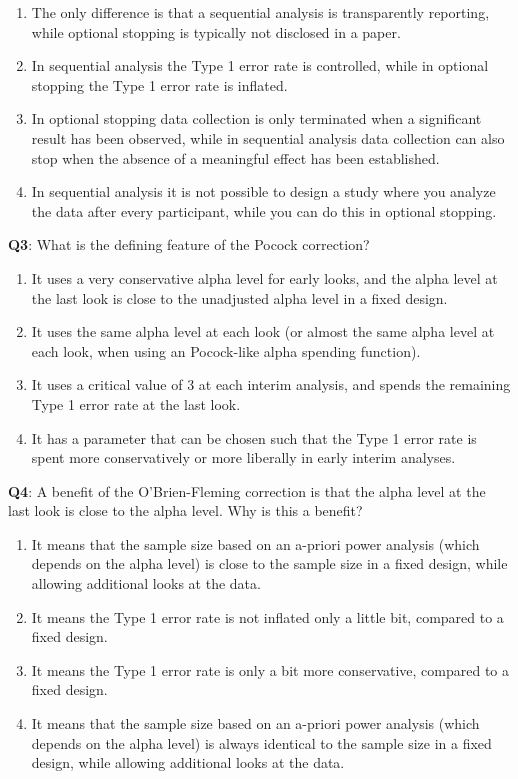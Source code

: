 \documentclass[
  oneside]{krantz}
\providecommand{\tightlist}{%
  \setlength{\itemsep}{0pt}\setlength{\parskip}{0pt}}
\begin{document}
\begin{enumerate}
\def\labelenumi{\Alph{enumi})}
\tightlist
\item
  The only difference is that a sequential analysis is transparently reporting, while optional stopping is typically not disclosed in a paper.
\item
  In sequential analysis the Type 1 error rate is controlled, while in optional stopping the Type 1 error rate is inflated.
\item
  In optional stopping data collection is only terminated when a significant result has been observed, while in sequential analysis data collection can also stop when the absence of a meaningful effect has been established.
\item
  In sequential analysis it is not possible to design a study where you analyze the data after every participant, while you can do this in optional stopping.
\end{enumerate}

\textbf{Q3}: What is the defining feature of the Pocock correction?

\begin{enumerate}
\def\labelenumi{\Alph{enumi})}
\tightlist
\item
  It uses a very conservative alpha level for early looks, and the alpha level at the last look is close to the unadjusted alpha level in a fixed design.
\item
  It uses the same alpha level at each look (or almost the same alpha level at each look, when using an Pocock-like alpha spending function).
\item
  It uses a critical value of 3 at each interim analysis, and spends the remaining Type 1 error rate at the last look.
\item
  It has a parameter that can be chosen such that the Type 1 error rate is spent more conservatively or more liberally in early interim analyses.
\end{enumerate}

\textbf{Q4}: A benefit of the O'Brien-Fleming correction is that the alpha level at the last look is close to the alpha level. Why is this a benefit?

\begin{enumerate}
\def\labelenumi{\Alph{enumi})}
\tightlist
\item
  It means that the sample size based on an a-priori power analysis (which depends on the alpha level) is close to the sample size in a fixed design, while allowing additional looks at the data.
\item
  It means the Type 1 error rate is not inflated only a little bit, compared to a fixed design.
\item
  It means the Type 1 error rate is only a bit more conservative, compared to a fixed design.
\item
  It means that the sample size based on an a-priori power analysis (which depends on the alpha level) is always identical to the sample size in a fixed design, while allowing additional looks at the data.
\end{enumerate}
\end{document}
